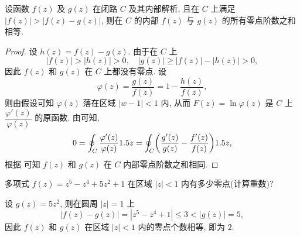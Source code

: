 
\begin{theorem}[儒歇定理]
  \label{thm:rouche}
  设函数 $f(z)$ 及 $g(z)$ 在闭路 $C$ 及其内部解析, 且在 $C$ 上满足 $|f(z)|>|f(z)-g(z)|$, 则在 $C$ 的内部 $f(z)$ 与 $g(z)$ 的所有零点阶数之和相等.
\end{theorem}

\begin{proof}
  设 $h(z)=f(z)-g(z)$.
  由于在 $C$ 上
  \[
    |f(z)|>|h(z)|>0,\quad
    |g(z)|\ge |f(z)|-|h(z)|>0,
  \]
  因此 $f(z)$ 和 $g(z)$ 在 $C$ 上都没有零点.
  设
  \[
    \varphi(z)=\frac{g(z)}{f(z)}=1-\frac{h(z)}{f(z)},
  \]
  则由假设可知 $\varphi(z)$ 落在区域 $|w-1|<1$ 内, 从而 $F(z)=\ln\varphi(z)$ 是 $C$ 上 $\dfrac{\varphi'(z)}{\varphi(z)}$ 的原函数.
  由\thmNL 可知,
  \[
     0
    =\oint_C \frac{\varphi'(z)}{\varphi(z)}1.5 z
    =\oint_C \biggl(\frac{g'(z)}{g(z)}-\frac{f'(z)}{f(z)}\biggr)1.5 z,
  \]
  根据 可知 $f(z)$ 和 $g(z)$ 在 $C$ 内部零点阶数之和相同.
\end{proof}

\begin{example}
  多项式 $f(z)=z^5-z^4+5z^2+1$ 在区域 $|z|<1$ 内有多少零点(计算重数)?
\end{example}

\begin{solution}
  设 $g(z)=5z^2$, 则在圆周 $|z|=1$ 上
  \[
    |f(z)-g(z)|=|z^5-z^4+1|\le 3<|g(z)|=5,
  \]
  因此 $f(z)$ 和 $g(z)$ 在区域 $|z|<1$ 内的零点个数相等, 即为 $2$.
\end{solution}

